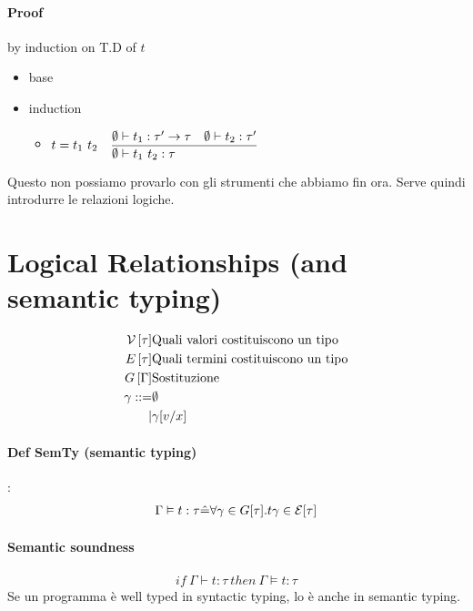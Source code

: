 \documentclass{article}
\begin{document}
\paragraph{Proof} by induction on T.D of $t$ \\
\begin{itemize}
    \item base 
    \item induction \begin{itemize}
            \item $t=t_1\ t_2\quad \st{\emptyset\vdash t_1\ t_2:\tau}{\emptyset\vdash t_1:\tau'\to\tau\quad\emptyset\vdash t_2:\tau'}$
        \end{itemize}
\end{itemize}
Questo non possiamo provarlo con gli strumenti che abbiamo fin ora. Serve quindi introdurre le relazioni logiche.

\section{Logical Relationships (and semantic typing)}
\begin{align*}
    \mathcal{V}\left[\tau\right] & \text{Quali valori costituiscono un tipo} \\
    E\left[\tau\right] & \text{Quali termini costituiscono un tipo}\\
    G\left[\Gamma\right] & \text{Sostituzione} \\
    \gamma ::=&\emptyset \\
    |&\gamma[v/x] 
\end{align*}

\paragraph{Def SemTy (semantic typing)}: \begin{align*}
    \Gamma \vDash t:\tau \hat{=} \forall \gamma\in G[\tau].t\gamma\in \mathcal{E}[\tau] 
\end{align*}

\paragraph{Semantic soundness}
\begin{align*}
    if\ \Gamma\vdash t:\tau\ then\ \Gamma \vDash t:\tau
\end{align*}
Se un programma è well typed in syntactic typing, lo è anche in semantic typing.
\end{document}
